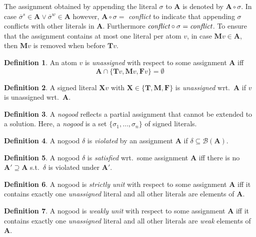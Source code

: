 \documentclass{vutinfth} %
\theoremstyle{example}
\theoremstyle{definition}
\newtheorem{definition}{Definition}[section]
\theoremstyle{theorem}
\theoremstyle{lemma}
\theoremstyle{corollary}
\newcommand{\negstrong}[1]{\overline{#1}^s}
\newcommand{\negweak}[1]{\overline{#1}^w}
\newcommand{\bass}{\mathcal{B}}
\newcommand{\ass}{\mathbf{A}}
\newcommand{\bT}{\mathbf{T}}
\newcommand{\bM}{\mathbf{M}}
\newcommand{\bF}{\mathbf{F}}
\newcommand{\bX}{\mathbf{X}}
\newcommand{\thrice}{{\{\bT, \bM, \bF \}}}
\begin{document}
The assignment obtained by appending the literal $\sigma$ to $\ass$ is denoted by $\ass \circ \sigma$. In case $\negstrong{\sigma} \in \ass \vee \negweak{\sigma} \in \ass$ however, $\ass \circ \sigma =$ \emph{conflict} to indicate that appending $\sigma$ conflicts with other literals in $\ass$. Furthermore $\emph{conflict} \circ \sigma = \emph{conflict}$. To ensure that the assignment contains at most one literal per atom $v$, in case $\mathbf{M}v \in \ass$, then $\mathbf{M}v$ is removed when before $\mathbf{T}v$.

\begin{definition}
An atom $v$ is \emph{unassigned} with respect to some assignment $\ass$ iff $$\ass \cap \{\bT v, \bM v, \bF v \} = \emptyset$$
\end{definition}

\begin{definition}
A signed literal $\bX v$ with $\bX \in \thrice$ is \emph{unassigned} wrt.~$\ass$ if $v$ is unassigned wrt.~$\ass$.
\end{definition}

\begin{definition}
A \emph{nogood} reflects a partial assignment that cannot be extended to a solution. Here, a \emph{nogood} is a set $\{ \sigma_1, \ldots, \sigma_n \}$ of signed literals.
\end{definition}

\begin{definition}
A nogood $\delta$ is \emph{violated} by an assignment $\mathbf{A}$ if $\delta \subseteq \bass(\ass)$.
\end{definition}

\begin{definition}
A nogood $\delta$ is \emph{satisfied} wrt.~some assignment $\ass$ iff there is no $\ass' \supseteq \ass$ s.t.~$\delta$ is violated under $\ass'$.
\end{definition}

\begin{definition}
A nogood is \emph{strictly unit} with respect to some assignment $\mathbf{A}$ iff it contains exactly one \emph{unassigned} literal and all other literals are elements of $\mathbf{A}$.
\end{definition}

\begin{definition}
A nogood is \emph{weakly unit} with respect to some assignment $\mathbf{A}$ iff it contains exactly one \emph{unassigned} literal and all other literals are \emph{weak} elements of $\mathbf{A}$.
\end{definition}
\end{document}
